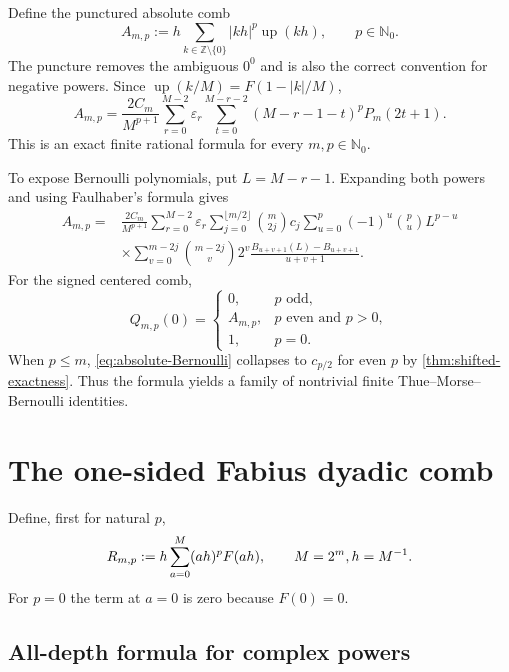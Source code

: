 \documentclass[11pt]{article}
\theoremstyle{definition}
\newcommand{\Up}{\operatorname{up}}
\newcommand{\eps}{\varepsilon}
\newcommand{\Z}{\mathbb{Z}}
\newcommand{\N}{\mathbb{N}}
\begin{document}
Define the punctured absolute comb
\begin{equation}
 A_{m,p}:=h\sum_{k\in\Z\setminus\{0\}}|kh|^p\Up(kh),
 \qquad p\in\N_0.
 \label{eq:Amp}
\end{equation}
The puncture removes the ambiguous $0^0$ and is also the correct convention
for negative powers.  Since $\Up(k/M)=F(1-|k|/M)$,
\begin{equation}
 A_{m,p}=\frac{2C_m}{M^{p+1}}
 \sum_{r=0}^{M-2}\eps_r
 \sum_{t=0}^{M-r-2}(M-r-1-t)^pP_m(2t+1).
 \label{eq:absolute-finite-double}
\end{equation}
This is an exact finite rational formula for every $m,p\in\N_0$.

To expose Bernoulli polynomials, put $L=M-r-1$.  Expanding both powers and
using Faulhaber's formula gives
\begin{equation}
\begin{split}
 A_{m,p}={}&\frac{2C_m}{M^{p+1}}
 \sum_{r=0}^{M-2}\eps_r
 \sum_{j=0}^{\lfloor m/2\rfloor}\binom m{2j}c_j
 \sum_{u=0}^{p}(-1)^u\binom puL^{p-u}\\
 &\times\sum_{v=0}^{m-2j}\binom{m-2j}{v}2^v
 \frac{B_{u+v+1}(L)-B_{u+v+1}}{u+v+1}.
\end{split}
\label{eq:absolute-Bernoulli}
\end{equation}
For the signed centered comb,
\[
 Q_{m,p}(0)=
 \begin{cases}
 0,&p\text{ odd},\\
 A_{m,p},&p\text{ even and }p>0,\\
 1,&p=0.
 \end{cases}
\]
When $p\le m$, \eqref{eq:absolute-Bernoulli} collapses to $c_{p/2}$ for even
$p$ by \cref{thm:shifted-exactness}.  Thus the formula yields a family of
nontrivial finite Thue--Morse--Bernoulli identities.

\section{The one-sided Fabius dyadic comb}
\label{sec:F-comb}

Define, first for natural $p$,
\begin{equation}
 R_{m,p}:=h\sum_{a=0}^{M}(ah)^pF(ah),
 \qquad M=2^m,\\ h=M^{-1}.
 \label{eq:Rmp}
\end{equation}
For $p=0$ the term at $a=0$ is zero because $F(0)=0$.

\subsection{All-depth formula for complex powers}
\end{document}
